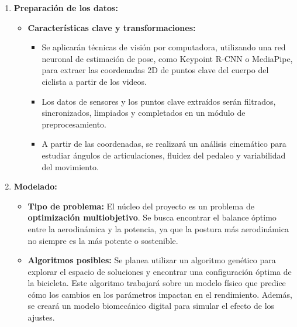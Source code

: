 \documentclass[
11pt, %
]{charter}
\begin{document}
\begin{enumerate}
  \item \textbf{Preparación de los datos:}
    \begin{itemize}
      \item \textbf{Características clave y transformaciones:}
        \begin{itemize}
          \item Se aplicarán técnicas de visión por computadora, utilizando una red neuronal de estimación de pose, como Keypoint R-CNN o MediaPipe, para extraer las coordenadas 2D de puntos clave del cuerpo del ciclista a partir de los videos.
          \item Los datos de sensores y los puntos clave extraídos serán filtrados, sincronizados, limpiados y completados en un módulo de preprocesamiento.
          \item A partir de las coordenadas, se realizará un análisis cinemático para estudiar ángulos de articulaciones, fluidez del pedaleo y variabilidad del movimiento.
        \end{itemize}
    \end{itemize}

  \item \textbf{Modelado:}
    \begin{itemize}
      \item \textbf{Tipo de problema:} El núcleo del proyecto es un problema de \textbf{optimización multiobjetivo}. Se busca encontrar el balance óptimo entre la aerodinámica y la potencia, ya que la postura más aerodinámica no siempre es la más potente o sostenible.
      \item \textbf{Algoritmos posibles:} Se planea utilizar un algoritmo genético para explorar el espacio de soluciones y encontrar una configuración óptima de la bicicleta. Este algoritmo trabajará sobre un modelo físico que predice cómo los cambios en los parámetros impactan en el rendimiento. Además, se creará un modelo biomecánico digital para simular el efecto de los ajustes.
    \end{itemize}


\end{enumerate}
\end{document}
